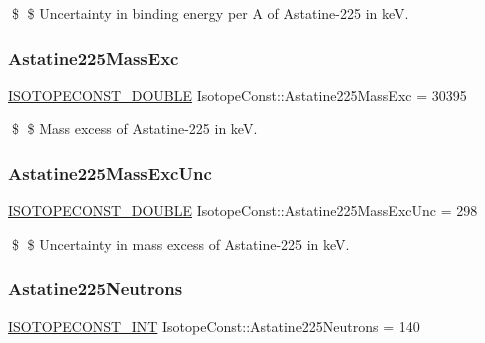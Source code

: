 \$ \$ Uncertainty in binding energy per A of Astatine-\/225 in keV. \mbox{\label{group___isotope_const-_astatine-_at225_gae29c84bb32ed5de673f866b350b1fed3}} 
\subsubsection{\texorpdfstring{Astatine225\+Mass\+Exc}{Astatine225MassExc}}
{\footnotesize\ttfamily \mbox{\hyperlink{group___isotope_const-_macros_ga8f45a7272ce02c0b4c65c44636ed719a}{I\+S\+O\+T\+O\+P\+E\+C\+O\+N\+S\+T\+\_\+\+D\+O\+U\+B\+LE}} Isotope\+Const\+::\+Astatine225\+Mass\+Exc = 30395}

\$ \$ Mass excess of Astatine-\/225 in keV. \mbox{\label{group___isotope_const-_astatine-_at225_gafb95f0cf03dddcce30cd886450c2428f}} 
\subsubsection{\texorpdfstring{Astatine225\+Mass\+Exc\+Unc}{Astatine225MassExcUnc}}
{\footnotesize\ttfamily \mbox{\hyperlink{group___isotope_const-_macros_ga8f45a7272ce02c0b4c65c44636ed719a}{I\+S\+O\+T\+O\+P\+E\+C\+O\+N\+S\+T\+\_\+\+D\+O\+U\+B\+LE}} Isotope\+Const\+::\+Astatine225\+Mass\+Exc\+Unc = 298}

\$ \$ Uncertainty in mass excess of Astatine-\/225 in keV. \mbox{\label{group___isotope_const-_astatine-_at225_ga0b307c49f7bea060ae8488622fe5dac0}} 
\subsubsection{\texorpdfstring{Astatine225\+Neutrons}{Astatine225Neutrons}}
{\footnotesize\ttfamily \mbox{\hyperlink{group___isotope_const-_macros_ga5f18360b3e99483a35c32d789e62621c}{I\+S\+O\+T\+O\+P\+E\+C\+O\+N\+S\+T\+\_\+\+I\+NT}} Isotope\+Const\+::\+Astatine225\+Neutrons = 140}

